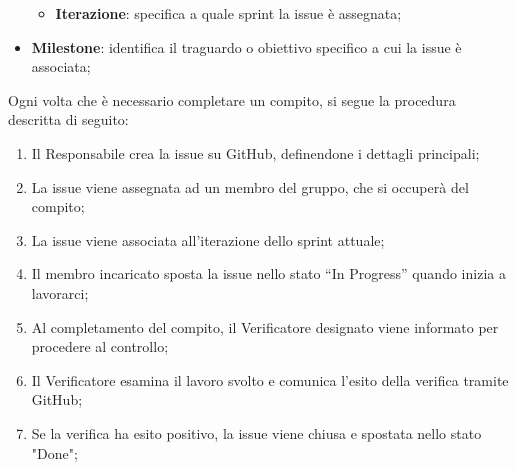 \documentclass[10pt]{article}
\begin{document}
\begin{justify}
\begin{itemize}
\begin{itemize}
            \item \textbf{Iterazione}: specifica a quale sprint la issue è assegnata;
        \end{itemize}
        \item \textbf{Milestone}: identifica il traguardo o obiettivo specifico a cui la issue è associata;
    \end{itemize}
    Ogni volta che è necessario completare un compito, si segue la procedura descritta di seguito:
    \begin{enumerate}
        \item Il Responsabile crea la issue su GitHub, definendone i dettagli principali;
        \item La issue viene assegnata ad un membro del gruppo, che si occuperà del compito;
        \item La issue viene associata all'iterazione dello sprint attuale;
        \item Il membro incaricato sposta la issue nello stato “In Progress” quando inizia a lavorarci;
        \item Al completamento del compito, il Verificatore designato viene informato per procedere al controllo;
        \item Il Verificatore esamina il lavoro svolto e comunica l’esito della verifica tramite GitHub;
        \item Se la verifica ha esito positivo, la issue viene chiusa e spostata nello stato "Done";
    \end{enumerate}


\end{justify}
\end{document}
